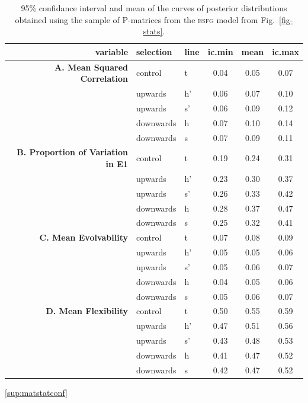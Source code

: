 \begin{refsection}
\begin{table}
\centering
\caption[Matrix statistics confidence intervals]{95\% confidance interval and mean of the curves of posterior distributions obtained using the sample of P-matrices from the \textsc{bsfg} model from Fig.~\ref{fig-stats}.}
\begin{tabular}{rllccc}
  \hline
variable & selection & line & ic.min & mean & ic.max \\
  \hline
\textbf{A. Mean Squared Correlation} & control & t & 0.04 & 0.05 & 0.07 \\
   & upwards & h' & 0.06 & 0.07 & 0.10 \\
   & upwards & s' & 0.06 & 0.09 & 0.12 \\
   & downwards & h & 0.07 & 0.10 & 0.14 \\
   & downwards & s & 0.07 & 0.09 & 0.11 \\
\textbf{B. Proportion of Variation in E1} & control & t & 0.19 & 0.24 & 0.31 \\
   & upwards & h' & 0.23 & 0.30 & 0.37 \\
   & upwards & s' & 0.26 & 0.33 & 0.42 \\
   & downwards & h & 0.28 & 0.37 & 0.47 \\
   & downwards & s & 0.25 & 0.32 & 0.41 \\
\textbf{C. Mean Evolvability} & control & t & 0.07 & 0.08 & 0.09 \\
   & upwards & h' & 0.05 & 0.05 & 0.06 \\
   & upwards & s' & 0.05 & 0.06 & 0.07 \\
   & downwards & h & 0.04 & 0.05 & 0.06 \\
   & downwards & s & 0.05 & 0.06 & 0.07 \\
\textbf{D. Mean Flexibility} & control & t & 0.50 & 0.55 & 0.59 \\
   & upwards & h' & 0.47 & 0.51 & 0.56 \\
   & upwards & s' & 0.43 & 0.48 & 0.53 \\
   & downwards & h & 0.41 & 0.47 & 0.52 \\
   & downwards & s & 0.42 & 0.47 & 0.52 \\
   \hline
\end{tabular}
\ref{sup:matstatconf}
\end{table}


\end{refsection}
